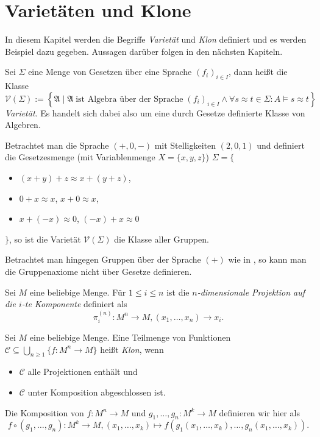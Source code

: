 \section{Varietäten und Klone}
In diesem Kapitel werden die Begriffe \emph{Varietät} und \emph{Klon} definiert und es werden Beispiel dazu gegeben. Aussagen darüber folgen in den nächsten Kapiteln.

\begin{definition}
    Sei $\Sigma$ eine Menge von Gesetzen über eine Sprache $(f_i)_{i \in I}$, dann heißt die Klasse
    $$ \mathcal{V}(\Sigma) := \left\{ \mathfrak{A} \mid \mathfrak{A} \;\text{ist Algebra über der Sprache}\; (f_i)_{i \in I} \land \forall s \approx t \in \Sigma: A\models s\approx t \right\} $$
    \emph{Varietät}. Es handelt sich dabei also um eine durch Gesetze definierte Klasse von Algebren.
\end{definition}

\begin{example}
    Betrachtet man die Sprache $(+, 0, -)$ mit Stelligkeiten $(2, 0, 1)$ und definiert die Gesetzesmenge (mit Variablenmenge $X = \{x,y,z\}$) $\Sigma = \{$
    \begin{itemize}[label={}]
        \item $(x + y) + z \approx x + (y + z)$,
        \item $0 + x \approx x$, $x + 0 \approx x$,
        \item $x + (-x) \approx 0$, $(-x) + x \approx 0$
    \end{itemize}
    $\}$, so ist die Varietät $\mathcal{V}(\Sigma)$ die Klasse aller Gruppen.
    
    Betrachtet man hingegen Gruppen über der Sprache $(+)$ wie in , so kann man die Gruppenaxiome nicht über Gesetze definieren.
\end{example}

\begin{definition}
    Sei $M$ eine beliebige Menge. Für $1 \le i \le n$ ist die \emph{$n$-dimensionale Projektion auf die $i$-te Komponente} definiert als
    $$ \pi_i^{(n)}: M^n \to M, (x_1, \ldots, x_n) \to x_i. $$
\end{definition}

\begin{definition}
    Sei $M$ eine beliebige Menge. Eine Teilmenge von Funktionen $\mathcal{C} \subseteq \bigcup_{n \ge 1} \{f: M^n \to M\}$ heißt \emph{Klon}, wenn 
    \begin{itemize}[label={--}]
        \item $\mathcal{C}$ alle Projektionen enthält und
        \item $\mathcal{C}$ unter Komposition abgeschlossen ist.
    \end{itemize}

    Die Komposition von $f: M^n \to M$ und $g_1, \ldots, g_n: M^k \to M$ definieren wir hier als 
    $$ f \circ (g_1, \ldots, g_n): M^k \to M, (x_1, \ldots, x_k) \mapsto f(g_1(x_1, \ldots, x_k), \ldots, g_n(x_1, \ldots, x_k)).$$
\end{definition}

